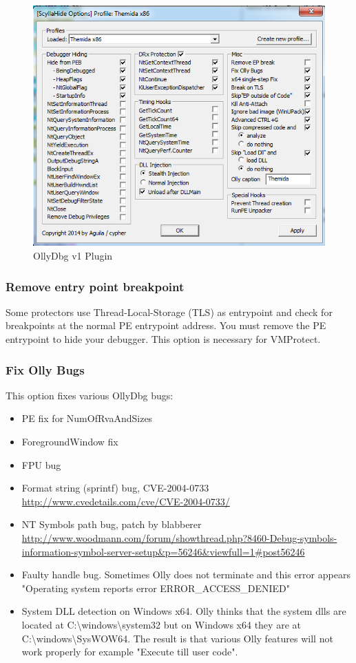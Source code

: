 \documentclass[10pt,a4paper]{article}
\begin{document}
\begin{figure}[H]
\centering
\includegraphics[scale=1]{ollyv1plugin.PNG}
\caption{OllyDbg v1 Plugin}
\end{figure}

\subsubsection{Remove entry point breakpoint}
Some protectors use Thread-Local-Storage (TLS) as entrypoint and check for breakpoints at the normal PE entrypoint address. You must remove the PE entrypoint to hide your debugger. This option is necessary for VMProtect.
\subsubsection{Fix Olly Bugs}
This option fixes various OllyDbg bugs: 
\begin{itemize}
\item PE fix for NumOfRvaAndSizes
\item ForegroundWindow fix
\item FPU bug
\item Format string (sprintf) bug, CVE-2004-0733 \url{http://www.cvedetails.com/cve/CVE-2004-0733/}
\item NT Symbols path bug, patch by blabberer \url{http://www.woodmann.com/forum/showthread.php?8460-Debug-symbols-information-symbol-server-setup&p=56246&viewfull=1#post56246}
\item Faulty handle bug. Sometimes Olly does not terminate and this error appears "Operating system reports error ERROR\_ACCESS\_DENIED"
\item System DLL detection on Windows x64. Olly thinks that the system dlls are located at C:\textbackslash{}windows\textbackslash{}system32 but on Windows x64 they are at C:\textbackslash{}windows\textbackslash{}SysWOW64. The result is that various Olly features will not work properly for example "Execute till user code".
\end{itemize}
\end{document}

